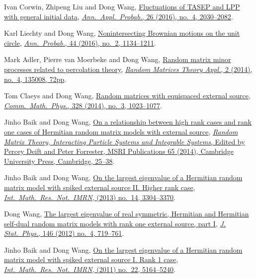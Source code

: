 \begin{etaremune}
\item
  Ivan Corwin, Zhipeng Liu and Dong Wang, \href{http://arxiv.org/abs/1412.5087}{Fluctuations of TASEP and LPP with general initial data}, \href{https://doi.org/10.1214/15-AAP1139}{\textit{Ann.\ Appl.\ Probab.}, 26 (2016), no.\ 4, 2030--2082}.
\item
  Karl Liechty and Dong Wang, \href{http://arxiv.org/abs/1312.7390}{Nonintersecting Brownian motions on the unit circle}, \href{https://doi.org/10.1214/14-AOP998}{\textit{Ann.\ Probab.}, 44 (2016), no.\ 2, 1134--1211}.
\item 
  Mark Adler, Pierre van Moerbeke and Dong Wang,
  \href{http://arxiv.org/abs/1301.7017}{Random matrix minor processes related to percolation theory}, \href{https://doi.org/10.1142/S2010326313500081}{\textit{Random Matrices Theory Appl.}, 2 (2014), no.\ 4, 135008, 72pp}.
\item 
  Tom Claeys and Dong Wang,
  \href{http://arxiv.org/abs/1212.3768}{Random matrices with equispaced external source}, \href{https://doi.org/10.1007/s00220-014-1988-y}{\textit{Comm.\ Math.\ Phys.}, 328 (2014), no.\ 3, 1023--1077}.
\item Jinho Baik and Dong Wang,
  \href{http://arxiv.org/abs/1207.0389}{On a relationship between high rank cases and rank one cases of Hermitian random matrix models with external source}, \href{http://www.cambridge.org/asia/catalogue/catalogue.asp?isbn=9781107079922}{\textit{Random Matrix Theory, Interacting Particle Systems and Integrable Systems}, Edited by Percey Deift and Peter Forrester, MSRI Publications 65 (2014), Cambridge University Press, Cambridge, 25--38}.
\item Jinho Baik and Dong Wang,
  \href{http://arxiv.org/abs/1104.2915}{On the largest eigenvalue of a Hermitian random matrix model with spiked external source II. Higher rank case}, \href{https://doi.org/10.1093/imrn/rns136}{\textit{Int.\ Math.\ Res.\ Not.\ IMRN}, (2013) no.\ 14, 3304--3370}.
\item Dong Wang,
  \href{http://arxiv.org/abs/1012.4144}{The largest eigenvalue of real symmetric, Hermitian and Hermitian self-dual random matrix models with rank one external source, part I}, \href{https://doi.org/10.1007/s10955-012-0417-x}{\textit{J. Stat.\ Phys.}, 146 (2012) no.\ 4, 719--761}.
\item Jinho Baik and  Dong Wang,
  \href{http://arxiv.org/abs/1010.4604}{On the largest eigenvalue of a Hermitian random matrix model with spiked external source I. Rank 1 case}, \href{https://doi.org/10.1093/imrn/rnq257}{\textit{Int.\ Math.\ Res.\ Not.\ IMRN}, (2011) no.\ 22, 5164--5240}.

\end{etaremune}
